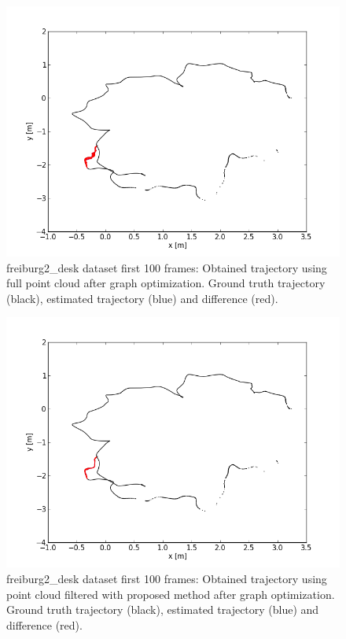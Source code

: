 \begin{figure}[H]
\begin{center}
\includegraphics[scale=0.75]{images/freiburg2_desk_1_100_fullcloud_optimized.png}
\caption{freiburg2\_desk dataset first 100 frames: Obtained trajectory using full point cloud after graph optimization. Ground truth trajectory (black), estimated trajectory (blue) and difference (red).}
\label{fig:jan}
\end{center}
\end{figure}

\begin{figure}[H]
\begin{center}
\includegraphics[scale=0.75]{images/freiburg2_desk_1_100_optimized.png}
\caption{freiburg2\_desk dataset first 100 frames: Obtained trajectory using point cloud filtered with proposed method after graph optimization. Ground truth trajectory (black), estimated trajectory (blue) and difference (red).}
\label{fig:jan}
\end{center}
\end{figure}


